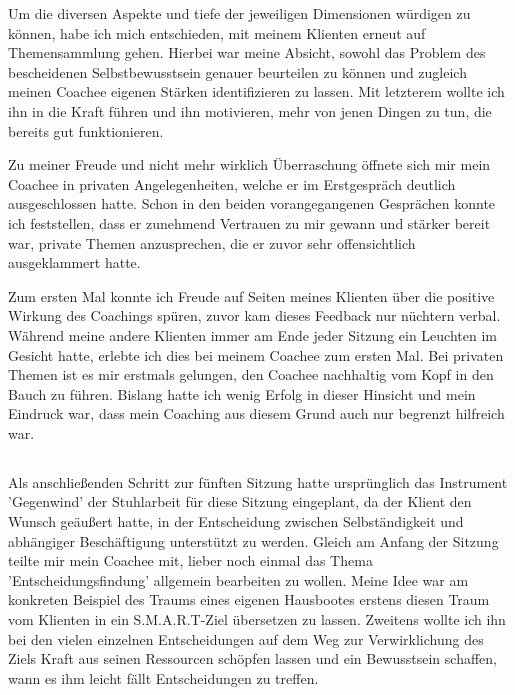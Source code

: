 \documentclass[11pt,a4paper]{article}
\begin{document}
Um die diversen Aspekte und tiefe der jeweiligen Dimensionen würdigen zu können, habe ich mich entschieden, mit meinem Klienten erneut auf Themensammlung gehen. Hierbei war meine Absicht, sowohl das Problem des bescheidenen Selbstbewusstsein genauer beurteilen zu können und zugleich meinen Coachee eigenen Stärken identifizieren zu lassen. Mit letzterem wollte ich ihn in die Kraft führen und ihn motivieren, mehr von jenen Dingen zu tun, die bereits gut funktionieren. 

Zu meiner Freude und nicht mehr wirklich Überraschung öffnete sich mir mein Coachee in privaten Angelegenheiten, welche er im Erstgespräch deutlich ausgeschlossen hatte. Schon in den beiden vorangegangenen Gesprächen konnte ich feststellen, dass er zunehmend Vertrauen zu mir gewann und stärker bereit war, private Themen anzusprechen, die er zuvor sehr offensichtlich ausgeklammert hatte.


Zum ersten Mal konnte ich Freude auf Seiten meines Klienten über die positive Wirkung des Coachings spüren, zuvor kam dieses Feedback nur nüchtern verbal. Während meine andere Klienten immer am Ende jeder Sitzung ein Leuchten im Gesicht hatte, erlebte ich dies bei meinem Coachee zum ersten Mal. Bei privaten Themen ist es mir erstmals gelungen, den Coachee nachhaltig vom Kopf in den Bauch zu führen. Bislang hatte ich wenig Erfolg in dieser Hinsicht und mein Eindruck war, dass mein Coaching aus diesem Grund auch nur begrenzt hilfreich war.


\subsection*{\color{Orange}{Sechste Sitzung: Abschlusssitzung}}

Als anschließenden Schritt zur fünften Sitzung hatte ursprünglich das Instrument 'Gegenwind' der Stuhlarbeit für diese Sitzung eingeplant, da der Klient den Wunsch geäußert hatte, in der Entscheidung zwischen Selbständigkeit und abhängiger Beschäftigung unterstützt zu werden. Gleich am Anfang der Sitzung teilte mir mein Coachee mit, lieber noch einmal das Thema 'Entscheidungsfindung' allgemein bearbeiten zu wollen. Meine Idee war am konkreten Beispiel des Traums eines eigenen Hausbootes erstens diesen Traum vom Klienten in ein S.M.A.R.T-Ziel übersetzen zu lassen. Zweitens wollte ich ihn bei den vielen einzelnen Entscheidungen auf dem Weg zur Verwirklichung des Ziels Kraft aus seinen Ressourcen schöpfen lassen und ein Bewusstsein schaffen, wann es ihm leicht fällt Entscheidungen zu treffen. 
\end{document}
